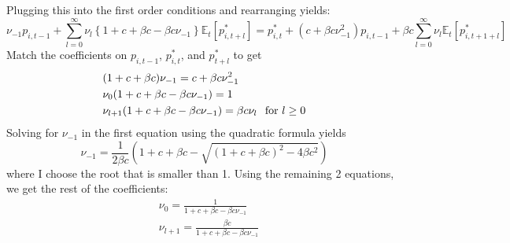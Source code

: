 \documentclass[11pt]{amsart}
\begin{document}
\begin{enumerate}[label = (\alph*)]
	Plugging this into the first order conditions and rearranging yields:
	\begin{dmath*}
		[1+c+\beta c] \nu_{-1} p_{i,t-1} + \sum_{l=0}^\infty \nu_l \left\lbrace 1+c+\beta c - \beta c \nu_{-1} \right\rbrace \mathbb{E}_t [p_{i,t+l}^*] = p_{i,t}^* + (c+\beta c \nu_{-1}^2) p_{i,t-1} + \beta c \sum_{l=0}^\infty  \nu_l \mathbb{E}_t [p_{i,t+1+l}^*]
	\end{dmath*}
	Match the coefficients on $p_{i,t-1}$, $p_{i,t}^*$, and $p_{t+l}^*$ to get
	\begin{align*}
		&(1 + c + \beta c) \nu_{-1} = c + \beta c \nu_{-1}^2 \\
		&\nu_0 (1 + c + \beta c - \beta c \nu_{-1}) = 1 \\
		&\nu_{l+1} (1 + c + \beta c - \beta c \nu_{-1}) = \beta c \nu_l \hspace{0.1in} \text{for $l \geq 0$}
	\end{align*}
	Solving for $\nu_{-1}$ in the first equation using the quadratic formula yields
	\begin{equation*}
		\nu_{-1} = \frac{1}{2 \beta c} \left(1 + c + \beta c - \sqrt{(1 + c + \beta c)^2 - 4 \beta c ^2} \right)
	\end{equation*}
	where I choose the root that is smaller than 1. Using the remaining 2 equations, we get the rest of the coefficients:
	\begin{align*}
		&\nu_0 = \frac{1}{1 + c + \beta c - \beta c \nu_{-1}} \\
		&\nu_{l+1} = \frac{\beta c}{1 + c + \beta c - \beta c \nu_{-1}}
	\end{align*}


\end{enumerate}
\end{document}
